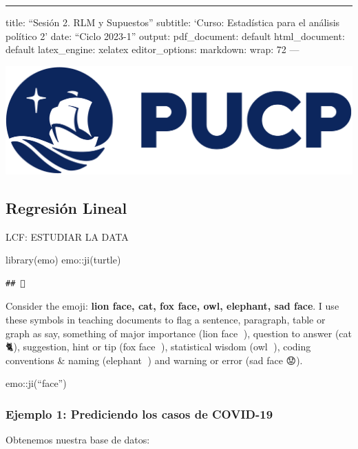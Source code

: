 \documentclass[
]{article}
\author{}
\date{\vspace{-2.5em}}
\newenvironment{Shaded}{\begin{snugshade}}{\end{snugshade}}
\newcommand{\FunctionTok}[1]{\textcolor[rgb]{0.00,0.00,0.00}{#1}}
\newcommand{\NormalTok}[1]{#1}
\newcommand{\SpecialCharTok}[1]{\textcolor[rgb]{0.00,0.00,0.00}{#1}}
\newcommand{\StringTok}[1]{\textcolor[rgb]{0.31,0.60,0.02}{#1}}
\begin{document}
\begin{center}\rule{0.5\linewidth}{0.5pt}\end{center}

title: ``Sesión 2. RLM y Supuestos'' subtitle: `Curso: Estadística para
el análisis político 2' date: ``Ciclo 2023-1'' output: pdf\_document:
default html\_document: default latex\_engine: xelatex editor\_options:
markdown: wrap: 72 ---

\includegraphics[width=0.3\linewidth]{logoPUCP}

\hypertarget{regresiuxf3n-lineal}{%
\subsection{Regresión Lineal}\label{regresiuxf3n-lineal}}

LCF: ESTUDIAR LA DATA

\begin{Shaded}
\begin{Highlighting}[]
\FunctionTok{library}\NormalTok{(emo)}
\NormalTok{emo}\SpecialCharTok{::}\FunctionTok{ji}\NormalTok{(}\StringTok{\textquotesingle{}turtle\textquotesingle{}}\NormalTok{)}
\end{Highlighting}
\end{Shaded}

\begin{verbatim}
## 🐢
\end{verbatim}

Consider the emoji: \textbf{lion face, cat, fox face, owl, elephant, sad
face}. I use these symbols in teaching documents to flag a sentence,
paragraph, table or graph as say, something of major importance (lion
face 🦁), question to answer (cat 🐈), suggestion, hint or tip (fox face
🦊), statistical wisdom (owl 🦉), coding conventions \& naming (elephant
🐘) and warning or error (sad face 😟).

emo::ji(``face'')

\hypertarget{ejemplo-1-prediciendo-los-casos-de-covid-19}{%
\subsubsection{Ejemplo 1: Prediciendo los casos de
COVID-19}\label{ejemplo-1-prediciendo-los-casos-de-covid-19}}

Obtenemos nuestra base de datos:
\end{document}
